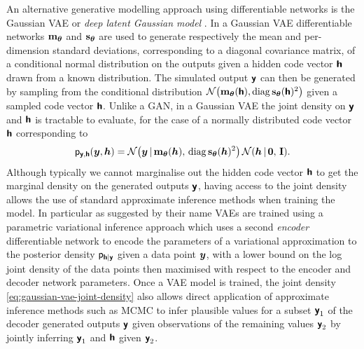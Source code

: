 
An alternative generative modelling approach using differentiable networks is the Gaussian \ac{VAE} \citep{kingma2013auto} or \emph{deep latent Gaussian model} \citep{rezende2014stochastic}. In a Gaussian \ac{VAE} differentiable networks ${\mathbf{m}}_{\boldsymbol{\theta}}$ and ${\mathbf{s}}_{\boldsymbol{\theta}}$ are used to generate respectively the mean and per-dimension standard deviations, corresponding to a diagonal covariance matrix, of a conditional normal distribution on the outputs given a hidden code vector $\boldsymbol{\mathsf{h}}$ drawn from a known distribution. The simulated output $\boldsymbol{\mathsf{y}}$ can then be generated by sampling from the conditional distribution $\nrm{\vctfunc{m}_{\vct{\theta}}(\rvct{h}), \diag\vctfunc{s}_{\vct{\theta}}(\rvct{h})^2}$ given a sampled code vector $\boldsymbol{\mathsf{h}}$. Unlike a \ac{GAN}, in a Gaussian \ac{VAE} the joint density on $\boldsymbol{\mathsf{y}}$ and $\boldsymbol{\mathsf{h}}$ is tractable to evaluate, for the case of a normally distributed code vector $\boldsymbol{\mathsf{h}}$ corresponding to
\begin{equation}\label{eq:gaussian-vae-joint-density}
  \pden{\rvct{y},\rvct{h}}(\vct{y},\vct{h}) = 
  \nrm{\vct{y} \gvn \vctfunc{m}_{\vct{\theta}}(\vct{h}),\, \diag\vctfunc{s}_{\vct{\theta}}(\vct{h})^2}\,
  \nrm{\vct{h} \gvn \vct{0},\,\idmtx}.
\end{equation}
Although typically we cannot marginalise out the hidden code vector $\boldsymbol{\mathsf{h}}$ to get the marginal density on the generated outputs $\boldsymbol{\mathsf{y}}$, having access to the joint density allows the use of standard approximate inference methods when training the model. In particular as suggested by their name \aclp{VAE} are trained using a parametric variational inference approach which uses a second \emph{encoder} differentiable network to encode the parameters of a variational approximation to the posterior density $\mathsf{p}_{\boldsymbol{\mathsf{h}}|\boldsymbol{\mathsf{y}}}$ given a data point $\boldsymbol{y}$, with a lower bound on the log joint density of the data points then maximised with respect to the encoder and decoder network parameters. Once a \ac{VAE} model is trained, the joint density \eqref{eq:gaussian-vae-joint-density} also allows direct application of approximate inference methods such as \acs{MCMC} to infer plausible values for a subset $\boldsymbol{\mathsf{y}}_1$ of the decoder generated outputs $\boldsymbol{\mathsf{y}}$ given observations of the remaining values $\boldsymbol{\mathsf{y}}_2$ by jointly inferring $\boldsymbol{\mathsf{y}}_1$ and $\boldsymbol{\mathsf{h}}$ given $\boldsymbol{\mathsf{y}}_2$.


